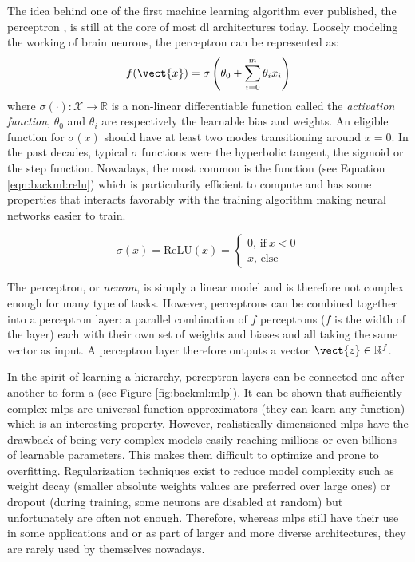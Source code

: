 The idea behind one of the first machine learning algorithm ever published, the
perceptron \parencite{rosenblatt1958perceptron}, is still at the core of most
\acrlong{dl} architectures today. Loosely modeling the working of brain neurons,
the perceptron can be represented as:
\begin{equation}
\label{eqn:backml:perceptron}
f(\vect{x}) = \sigma\left(\theta_0 + \sum_{i=0}^m \theta_i x_i\right)
\end{equation}
where $\sigma(\cdot): \mathcal{X} \rightarrow \mathbb{R}$ is a non-linear
differentiable function called the \textit{activation function}, $\theta_0$ and
$\theta_i$ are respectively the learnable bias and weights. An eligible function
for $\sigma(x)$ should have at least two modes transitioning around $x=0$. In the
past decades, typical $\sigma$ functions were the hyperbolic tangent, the sigmoid
or the step function. Nowadays, the most common is the  function
(see Equation \ref{eqn:backml:relu}) which is particularily efficient to compute
and has some properties that interacts favorably with the training algorithm making
neural networks easier to train.

\begin{equation}
\label{eqn:backml:relu}
\sigma(x) = \text{ReLU}(x) = \begin{cases}
0\text{, if}~ x < 0\\
x\text{, else}
\end{cases}
\end{equation}

The perceptron, or \textit{neuron}, is simply a linear model and is therefore not
complex enough for many type of tasks. However, perceptrons can be combined together
into a perceptron layer: a parallel combination of $f$ perceptrons ($f$ is the
width of the layer) each with their own set of weights and biases and all taking
the same vector as input. A perceptron layer therefore outputs a vector
$\vect{z} \in \mathbb{R}^f$.

In the spirit of learning a hierarchy, perceptron layers can be connected one
after another to form a  (see Figure \ref{fig:backml:mlp}). It
can be shown that sufficiently complex \acrshort{mlp}s are universal function
approximators (\ie they can learn any function) \parencite{hornik1989multilayer}
which is an interesting property. However, realistically dimensioned \acrshort{mlp}s
have the drawback of being very complex models easily reaching millions or even
billions of learnable parameters. This makes them difficult to optimize and prone
to overfitting. Regularization techniques exist to reduce model complexity such
as weight decay (\ie smaller absolute weights values are preferred over large
ones) or dropout \parencite{srivastava2014dropout} (\ie during training, some
neurons are disabled at random) but unfortunately are often not enough. Therefore,
whereas \acrshort{mlp}s still have their use in some applications and or as part
of larger and more diverse architectures, they are rarely used by themselves
nowadays.


